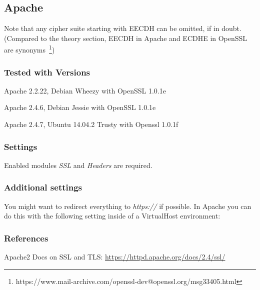 \subsection{Apache}

Note that any cipher suite starting with EECDH can be omitted, if in doubt.
(Compared to the theory section, EECDH in Apache and ECDHE in OpenSSL are
synonyms~\footnote{https://www.mail-archive.com/openssl-dev@openssl.org/msg33405.html})

\subsubsection{Tested with Versions}
\begin{itemize*}
  \item Apache 2.2.22, Debian Wheezy with OpenSSL 1.0.1e
  \item Apache 2.4.6, Debian Jessie with OpenSSL 1.0.1e
  \item Apache 2.4.7, Ubuntu 14.04.2 Trusty with Openssl 1.0.1f
\end{itemize*}

\subsubsection{Settings}
Enabled modules \emph{SSL} and \emph{Headers} are required.


\subsubsection{Additional settings}
You might want to redirect everything to \emph{https://} if possible. In Apache
you can do this with the following setting inside of a VirtualHost environment:



\subsubsection{References}
\begin{itemize*}
  \item Apache2 Docs on SSL and TLS: \url{https://httpd.apache.org/docs/2.4/ssl/}
\end{itemize*}


